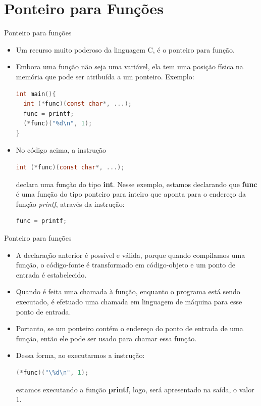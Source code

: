 \section{Ponteiro para Funções}
\begin{frame}[fragile,c]{Ponteiro para funções}
  \begin{itemize}[<+->]
    \item Um recurso muito poderoso da linguagem C, é o ponteiro para função.
    \item Embora uma função não seja uma variável, ela tem uma posição física na memória que pode ser atribuída a um ponteiro. Exemplo:
\begin{lstlisting}[language=C]
int main(){
  int (*func)(const char*, ...);
  func = printf;
  (*func)("%d\n", 1);
}
\end{lstlisting}
 \item No código acima, a instrução
\begin{lstlisting}[language=C]
 int (*func)(const char*, ...);
\end{lstlisting} 
declara uma função do tipo \textbf{int}. Nesse exemplo, estamos declarando que \textbf{func} é uma função do tipo ponteiro para inteiro que aponta para o endereço da função \textit{printf}, através da instrução: 
\begin{lstlisting}[language=C]
 func = printf;
\end{lstlisting}
\end{itemize}
\end{frame}

\begin{frame}[fragile,c]{Ponteiro para funções}
\begin{itemize}[<+->]
  \item A declaração anterior é possível e válida, porque quando compilamos uma função, o código-fonte é transformado em código-objeto e um ponto de entrada é estabelecido. 
  \item Quando é feita uma chamada à função, enquanto o programa está sendo executado, é efetuado uma chamada em linguagem de máquina para esse ponto de entrada.
  \item Portanto, se um ponteiro contém o endereço do ponto de entrada de uma função, então ele pode ser usado para chamar essa função.
  \item Dessa forma, ao executarmos a instrução:
\begin{lstlisting}[language=C]
(*func)("\%d\n", 1);
\end{lstlisting} estamos executando a função \textbf{printf}, logo, será apresentado na saída, o valor 1.
\end{itemize}
\end{frame}

